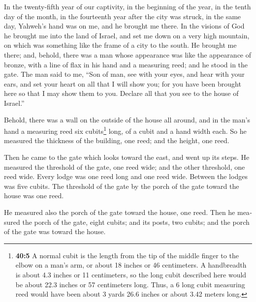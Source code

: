 \begin{paracol}{2}
\begin{otherlanguage}{english}
 In the twenty-fifth year of our captivity, in the
beginning of the year, in the tenth day of the month, in the fourteenth
year after the city was struck, in the same day, Yahweh's hand was on
me, and he brought me there.  In the visions of God he
brought me into the land of Israel, and set me down on a very high
mountain, on which was something like the frame of a city to the south.
 He brought me there; and, behold, there was a man whose
appearance was like the appearance of bronze, with a line of flax in his
hand and a measuring reed; and he stood in the gate.  The
man said to me, ``Son of man, see with your eyes, and hear with your
ears, and set your heart on all that I will show you; for you have been
brought here so that I may show them to you. Declare all that you see to
the house of Israel.''

 Behold, there was a wall on the outside of the house all
around, and in the man's hand a measuring reed six cubits\footnote{\textbf{40:5}
  A normal cubit is the length from the tip of the middle finger to the
  elbow on a man's arm, or about 18 inches or 46 centimeters. A
  handbreadth is about 4.3 inches or 11 centimeters, so the long cubit
  described here would be about 22.3 inches or 57 centimeters long.
  Thus, a 6 long cubit measuring reed would have been about 3 yards 26.6
  inches or about 3.42 meters long.} long, of a cubit and a hand width
each. So he measured the thickness of the building, one reed; and the
height, one reed.

 Then he came to the gate which looks toward the east, and
went up its steps. He measured the threshold of the gate, one reed wide;
and the other threshold, one reed wide.  Every lodge was
one reed long and one reed wide. Between the lodges was five cubits. The
threshold of the gate by the porch of the gate toward the house was one
reed.

 He measured also the porch of the gate toward the house,
one reed.  Then he measured the porch of the gate, eight
cubits; and its posts, two cubits; and the porch of the gate was toward
the house.


\end{otherlanguage}
\end{paracol}
